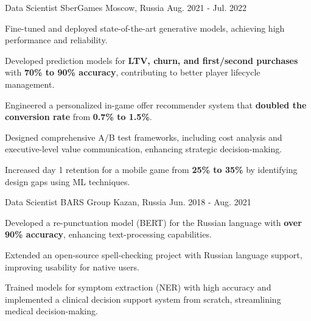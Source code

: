 \begin{cventries}
\cventry
  {Data Scientist} %
  {SberGames} %
  {Moscow, Russia} %
  {Aug. 2021 - Jul. 2022} %
  {
    \begin{cvitems} %
      \item {Fine-tuned and deployed state-of-the-art generative models, achieving high performance and reliability.}
      \item {Developed prediction models for \textbf{LTV, churn, and first/second purchases} with \textbf{70\% to 90\% accuracy}, contributing to better player lifecycle management.}
      \item {Engineered a personalized in-game offer recommender system that \textbf{doubled the conversion rate} from \textbf{0.7\% to 1.5\%}.}
      \item {Designed comprehensive A/B test frameworks, including cost analysis and executive-level value communication, enhancing strategic decision-making.}
      \item {Increased day 1 retention for a mobile game from \textbf{25\% to 35\%} by identifying design gaps using ML techniques.}
    \end{cvitems}
  }

\cventry
{Data Scientist} %
{BARS Group} %
{Kazan, Russia} %
{Jun. 2018 - Aug. 2021} %
{
  \begin{cvitems} %
    \item {Developed a re-punctuation model (BERT) for the Russian language with \textbf{over 90\% accuracy}, enhancing text-processing capabilities.}
    \item {Extended an open-source spell-checking project with Russian language support, improving usability for native users.}
    \item {Trained models for symptom extraction (NER) with high accuracy and implemented a clinical decision support system from scratch, streamlining medical decision-making.}
  \end{cvitems}
}




\end{cventries}
